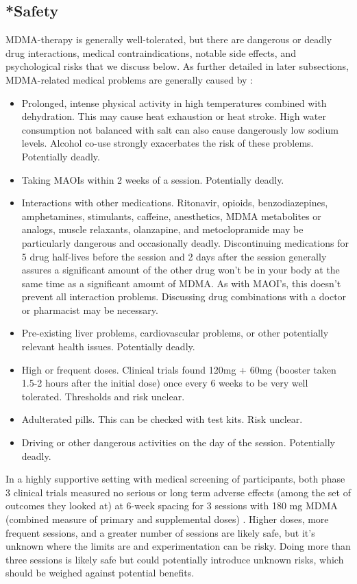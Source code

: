 \documentclass[12pt,letterpaper]{article}
\begin{document}
\subsection{*Safety}
\label{sec:safety}
MDMA-therapy is generally well-tolerated, but there are dangerous or deadly drug interactions, medical contraindications, notable side effects, and psychological risks that we discuss below. As further detailed in later subsections, MDMA-related medical problems are generally caused by \cite{riggDeaths,roxburghDeaths}:
\begin{itemize}
    \item Prolonged, intense physical activity in high temperatures combined with dehydration. This may cause heat exhaustion or heat stroke. High water consumption not balanced with salt can also cause dangerously low sodium levels. Alcohol co-use strongly exacerbates the risk of these problems. Potentially deadly.
    \item Taking MAOIs within 2 weeks of a session. Potentially deadly.
    \item Interactions with other medications. Ritonavir, opioids, benzodiazepines, amphetamines, stimulants, caffeine, anesthetics, MDMA metabolites or analogs, muscle relaxants, olanzapine, and metoclopramide may be particularly dangerous and occasionally deadly. Discontinuing medications for 5 drug half-lives before the session and 2 days after the session generally assures a significant amount of the other drug won't be in your body at the same time as a significant amount of MDMA. As with MAOI's, this doesn't prevent all interaction problems. Discussing drug combinations with a doctor or pharmacist may be necessary.
    \item Pre-existing liver problems, cardiovascular problems, or other potentially relevant health issues. Potentially deadly.
    \item High or frequent doses. Clinical trials found 120mg + 60mg (booster taken 1.5-2 hours after the initial dose) once every 6 weeks to be very well tolerated. Thresholds and risk unclear.
    \item Adulterated pills. This can be checked with test kits. Risk unclear.
    \item Driving or other dangerous activities on the day of the session. Potentially deadly.
\end{itemize}

In a highly supportive setting with medical screening of participants, both phase 3 clinical trials measured no serious or long term adverse effects (among the set of outcomes they looked at) at 6-week spacing for 3 sessions with 180 mg MDMA (combined measure of primary and supplemental doses) \cite{mitchellMDMAClinicalTrial,mitchellMDMAClinicalTrial2}. Higher doses, more frequent sessions, and a greater number of sessions are likely safe, but it's unknown where the limits are and experimentation can be risky. Doing more than three sessions is likely safe but could potentially introduce unknown risks, which should be weighed against potential benefits.
\end{document}
